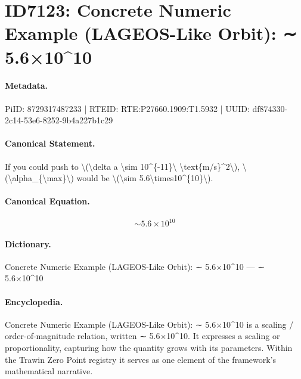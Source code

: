 \section*{ID7123: Concrete Numeric Example (LAGEOS-Like Orbit): ∼ 5.6×10\textasciicircum{}10}
\paragraph{Metadata.}
PiID: 8729317487233 | RTEID: RTE:P27660.1909:T1.5932 | UUID: df874330-2c14-53e6-8252-9b4a227b1c29

\paragraph{Canonical Statement.}
If you could push to \textbackslash{}(\textbackslash{}delta a \textbackslash{}sim 10\textasciicircum{}\{-11\}\textbackslash{} \textbackslash{}text\{m/s\}\textasciicircum{}2\textbackslash{}), \textbackslash{}(\textbackslash{}alpha\_\{\textbackslash{}max\}\textbackslash{}) would be \textbackslash{}(\textbackslash{}sim 5.6\textbackslash{}times10\textasciicircum{}\{10\}\textbackslash{}).

\paragraph{Canonical Equation.}
\[
\sim 5.6\times10^{10}
\]

\paragraph{Dictionary.}
Concrete Numeric Example (LAGEOS-Like Orbit): ∼ 5.6×10\textasciicircum{}10 — ∼ 5.6×10\textasciicircum{}10

\paragraph{Encyclopedia.}
Concrete Numeric Example (LAGEOS-Like Orbit): ∼ 5.6×10\textasciicircum{}10 is a scaling / order-of-magnitude relation, written ∼ 5.6×10\textasciicircum{}10. It expresses a scaling or proportionality, capturing how the quantity grows with its parameters. Within the Trawin Zero Point registry it serves as one element of the framework's mathematical narrative.
